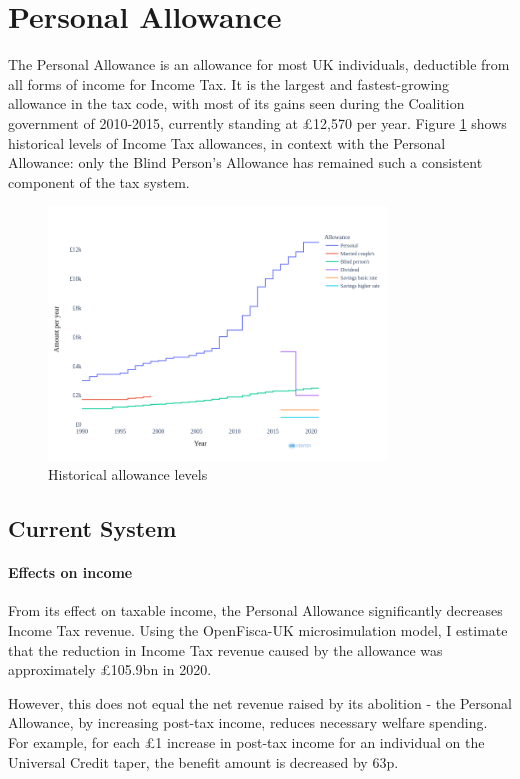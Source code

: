 \documentclass{article}
\begin{document}
    \section{Personal Allowance}
    The Personal Allowance is an allowance for most UK individuals, deductible from all forms of income for Income Tax. It is the largest and fastest-growing allowance in the tax code, with most of its gains seen during the Coalition government of 2010-2015, currently standing at £12,570 per year. Figure \ref{fig:PA_hist} shows historical levels of Income Tax allowances, in context with the Personal Allowance: only the Blind Person's Allowance has remained such a consistent component of the tax system.
    \begin{figure}
        \centering
        \includegraphics[width=0.8\textwidth]{images/fig_1.png}
        \caption{Historical allowance levels}
        \label{fig:PA_hist}
    \end{figure}

    \subsection{Current System}

    \paragraph{Effects on income}

    From its effect on taxable income, the Personal Allowance significantly decreases Income Tax revenue. Using the OpenFisca-UK microsimulation model, I estimate that the reduction in Income Tax revenue caused by the allowance was approximately £105.9bn in 2020. 
    
    However, this does not equal the net revenue raised by its abolition - the Personal Allowance, by increasing post-tax income, reduces necessary welfare spending. For example, for each £1 increase in post-tax income for an individual on the Universal Credit taper, the benefit amount is decreased by 63p. 
    
\end{document}
